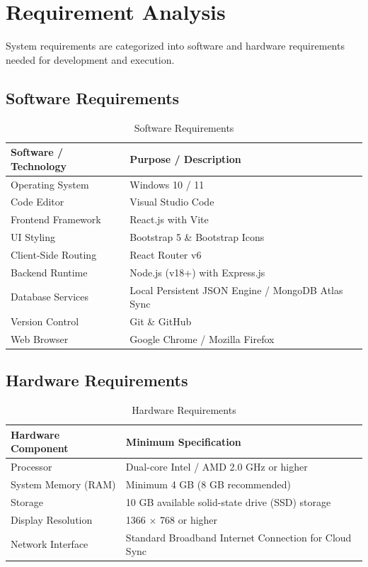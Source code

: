 \documentclass[12pt,a4paper]{report}
\begin{document}
\section{Requirement Analysis}
System requirements are categorized into software and hardware requirements needed for development and execution.

\subsection{Software Requirements}
\begin{table}[h!]
    \centering
    \caption{Software Requirements}
    \label{tab:software_requirements}
    \begin{tabular}{p{5cm} p{9cm}}
        \toprule
        \textbf{Software / Technology} & \textbf{Purpose / Description} \\
        \midrule
        Operating System & Windows 10 / 11 \\
        Code Editor & Visual Studio Code \\
        Frontend Framework & React.js with Vite \\
        UI Styling & Bootstrap 5 \& Bootstrap Icons \\
        Client-Side Routing & React Router v6 \\
        Backend Runtime & Node.js (v18+) with Express.js \\
        Database Services & Local Persistent JSON Engine / MongoDB Atlas Sync \\
        Version Control & Git \& GitHub \\
        Web Browser & Google Chrome / Mozilla Firefox \\
        \bottomrule
    \end{tabular}
\end{table}

\subsection{Hardware Requirements}
\begin{table}[h!]
    \centering
    \caption{Hardware Requirements}
    \label{tab:hardware_requirements}
    \begin{tabular}{p{5cm} p{9cm}}
        \toprule
        \textbf{Hardware Component} & \textbf{Minimum Specification} \\
        \midrule
        Processor & Dual-core Intel / AMD 2.0 GHz or higher \\
        System Memory (RAM) & Minimum 4 GB (8 GB recommended) \\
        Storage & 10 GB available solid-state drive (SSD) storage \\
        Display Resolution & 1366 $\times$ 768 or higher \\
        Network Interface & Standard Broadband Internet Connection for Cloud Sync \\
        \bottomrule
    \end{tabular}
\end{table}
\end{document}
